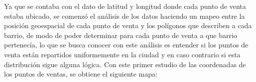 Ya que se contaba con el dato de latitud y longitud donde cada punto de venta estaba ubicado, se comenzó el análisis de los datos haciendo un mapeo entre la posición geoespacial de cada punto de venta y los polígonos que describen a cada barrio, de modo de poder determinar para cada punto de venta a que barrio pertenecía, lo que se busca conocer con este análisis es entender si los puntos de venta están repartidos uniformemente en la ciudad y en caso contrario si esta distribución sigue alguna lógica. Con este primer estudio de las coordenadas de los puntos de ventas, se obtiene el siguiente mapa:





